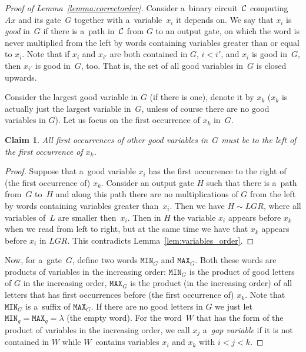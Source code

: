 \documentclass[11pt,letterpaper]{article}
\newtheorem{claim}{Claim}
\newcommand{\mmin}{\texttt{MIN}}
\newcommand{\mmax}{\texttt{MAX}}
\begin{document}
\begin{proof}[Proof of Lemma~\ref{lemma:correctorder}]
Consider a~binary circuit~${\cal C}$ computing~$Ax$ and its gate~$G$ together with a~variable~$x_i$ it depends on.
We say that $x_i$ is \emph{good} in~$G$ if there is
a~path in~${\cal C}$ from $G$ to an output gate, on which the word is never multiplied from the left by words containing variables greater than or equal to $x_i$.
Note that if $x_i$ and $x_{i'}$ are both contained in $G$, $i<i'$, and $x_i$ is good in~$G$, then $x_{i'}$ is good in~$G$, too. That is, the set of all good variables in~$G$ is closed upwards.

Consider the largest good variable in $G$ (if there is one), denote it by $x_k$ ($x_k$ is actually just the largest variable in~$G$, unless of course there are no good variables in $G$). Let us focus on the first occurrence of $x_k$ in~$G$.

\begin{claim}
All first occurrences of other good variables in~$G$ must be to the left of the first occurrence of $x_k$.
\end{claim}

\begin{proof}
Suppose that a~good variable $x_i$ has the first occurrence to the right of (the first occurrence of) $x_k$. Consider an output gate $H$ such that there is a~path from~$G$ to~$H$ and along this path there are no multiplications of $G$ from the left by words containing variables greater than~$x_i$. Then we have $H \sim LGR$, where all variables of~$L$ are smaller then~$x_i$. Then in $H$ the variable $x_i$ appears before $x_k$ when we read from left to right, but at the same time we have that $x_k$ appears before $x_i$ in $LGR$. This contradicts Lemma~\ref{lem:variables_order}.
\end{proof}

Now, for a~gate~$G$, define two words $\mmin_G$ and $\mmax_G$. Both these words are products of variables in the increasing order: $\mmin_G$ is the product of good letters of $G$ in the increasing order, $\mmax_G$ is the product (in the increasing order) of all letters that has first occurrences before (the first occurrence of) $x_k$. Note that $\mmin_G$ is
a~suffix of $\mmax_G$. If there are no good letters in $G$ we just let $\mmin_g=\mmax_g=\lambda$ (the empty word).
%
For the word~$W$ that has the form of the product of variables in the increasing order, we call $x_j$ a~\emph{gap variable} if it is not contained in $W$
while $W$~contains variables $x_i$ and $x_k$ with $i < j < k$.


\end{proof}
\end{document}
